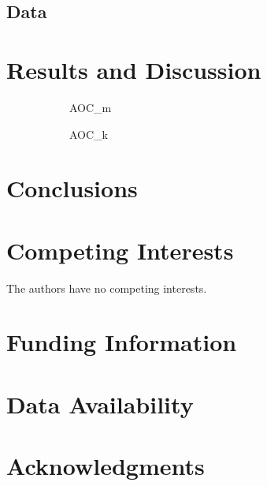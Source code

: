 \documentclass[12pt, oneside]{article}   	%
\begin{document}
\subsection{Data} 
\section{Results and Discussion}
	
\begin{figure}[H]
\centering
\begin{subfigure}[t]{0.48\textwidth}
\centering
\caption{AOC\_m}
\end{subfigure}
\hfill
\begin{subfigure}[t]{0.48\textwidth}
\centering
\caption{AOC\_k}
\end{subfigure}
\caption{}
\label{fig:overlapping}
\end{figure}
		
\section{Conclusions}
	
\section*{Competing Interests} \vspace{3mm} The authors have no competing interests. 
	
\section*{Funding Information} 
	
\section*{Data Availability} 
	
\section*{Acknowledgments} 



\end{document}
